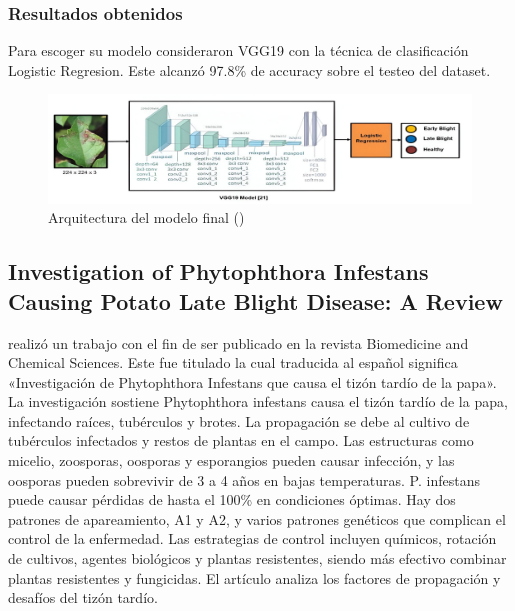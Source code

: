 \subsubsection{Resultados obtenidos}
Para escoger su modelo consideraron VGG19 con la técnica de clasificación Logistic Regresion. Este alcanzó 97.8\% de accuracy sobre el testeo del dataset. 

\begin{figure}[H]
	\begin{center}
		\includegraphics[width=1\textwidth]{2/figures/ant7.2.jpeg}
		\caption{Arquitectura del modelo final (\cite{antecedente7})}
	\end{center}
\end{figure}
\subsection{Investigation of Phytophthora Infestans Causing Potato Late Blight Disease: A Review \citep*{antecedente4}}

\citeauthor{antecedente4} realizó un trabajo con el fin de ser publicado en la revista Biomedicine and Chemical Sciences. Este fue titulado  la cual traducida al español significa  «Investigación de Phytophthora Infestans que causa el tizón tardío de la papa». La investigación sostiene Phytophthora infestans causa el tizón tardío de la papa, infectando raíces, tubérculos y brotes. La propagación se debe al cultivo de tubérculos infectados y restos de plantas en el campo. Las estructuras como micelio, zoosporas, oosporas y esporangios pueden causar infección, y las oosporas pueden sobrevivir de 3 a 4 años en bajas temperaturas. P. infestans puede causar pérdidas de hasta el 100\% en condiciones óptimas. Hay dos patrones de apareamiento, A1 y A2, y varios patrones genéticos que complican el control de la enfermedad. Las estrategias de control incluyen químicos, rotación de cultivos, agentes biológicos y plantas resistentes, siendo más efectivo combinar plantas resistentes y fungicidas. El artículo analiza los factores de propagación y desafíos del tizón tardío.
